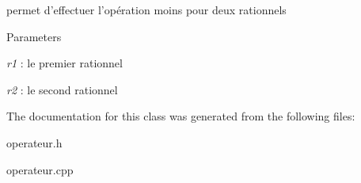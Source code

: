 permet d'effectuer l'opération moins pour deux rationnels 


\begin{DoxyParams}{Parameters}
\item[{\em r1}]: le premier rationnel \item[{\em r2}]: le second rationnel \end{DoxyParams}


The documentation for this class was generated from the following files:\begin{DoxyCompactItemize}
\item 
operateur.h\item 
operateur.cpp\end{DoxyCompactItemize}
